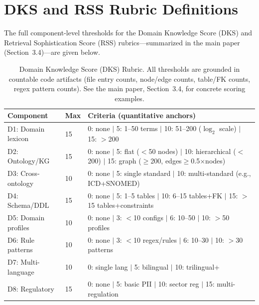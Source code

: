 \documentclass[10pt,a4paper]{article}
\begin{document}
\section{DKS and RSS Rubric Definitions}
\label{sec:supp_rubric}
The full component-level thresholds for the Domain Knowledge Score (DKS) and Retrieval Sophistication Score (RSS) rubrics---summarized in the main paper (Section~3.4)---are given below.

\begin{table}[t]
\centering
\caption{Domain Knowledge Score (DKS) Rubric. All thresholds are grounded in countable code artifacts (file entry counts, node/edge counts, table/FK counts, regex pattern counts). See the main paper, Section~3.4, for concrete scoring examples.}
\label{tab:dks_rubric}
\small
\begin{tabular}{@{}llp{4.2cm}@{}}
\toprule
\textbf{Component} & \textbf{Max} & \textbf{Criteria (quantitative anchors)} \\
\midrule
D1: Domain lexicon & 15 & 0: none $|$ 5: 1--50 terms $|$ 10: 51--200 ($\log_2$ scale) $|$ 15: $>$200 \\
D2: Ontology/KG & 15 & 0: none $|$ 5: flat ($<$50 nodes) $|$ 10: hierarchical ($<$200) $|$ 15: graph ($\geq$200, edges$\geq$0.5$\times$nodes) \\
D3: Cross-ontology & 10 & 0: none $|$ 5: single standard $|$ 10: multi-standard (e.g., ICD+SNOMED) \\
D4: Schema/DDL & 15 & 0: none $|$ 5: 1--5 tables $|$ 10: 6--15 tables+FK $|$ 15: $>$15 tables+constraints \\
D5: Domain profiles & 10 & 0: none $|$ 3: $<$10 configs $|$ 6: 10--50 $|$ 10: $>$50 profiles \\
D6: Rule patterns & 10 & 0: none $|$ 3: $<$10 regex/rules $|$ 6: 10--30 $|$ 10: $>$30 patterns \\
D7: Multi-language & 10 & 0: single lang $|$ 5: bilingual $|$ 10: trilingual+ \\
D8: Regulatory & 15 & 0: none $|$ 5: basic PII $|$ 10: sector reg $|$ 15: multi-regulation \\
\bottomrule
\end{tabular}
\end{table}
\end{document}
